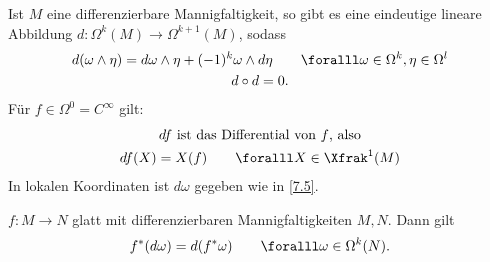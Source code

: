 \begin{thm}
	Ist $M$ eine differenzierbare Mannigfaltigkeit, so gibt es eine eindeutige lineare Abbildung $ d: \Omega^k(M) \to \Omega^{k+1}(M) $, sodass
	\begin{gather*}
		d(\omega \wedge \eta) = d\omega \wedge \eta + (-1)^k \omega \wedge d \eta \qquad \foralll \omega \in \Omega^k, \eta \in \Omega^l\\
		d \circ d = 0.
	\end{gather*}
	Für $ f \in \Omega^0 = C^\infty $ gilt:
	\begin{gather*}
		df \ \text{ist das Differential von $f$, also}\\
		df(X) = X(f) \qquad \foralll X \in \Xfrak^1(M)
	\end{gather*}
	In lokalen Koordinaten ist $d\omega$ gegeben wie in \ref{7.5}.
\end{thm}

\addtocounter{thm}{-1}

\begin{lem}
	$ f: M \to N $ glatt mit differenzierbaren Mannigfaltigkeiten $M,N$. Dann gilt
	\[ f^*(d\omega) = d(f^*\omega) \qquad \foralll \omega \in \Omega^k(N). \]
\end{lem}